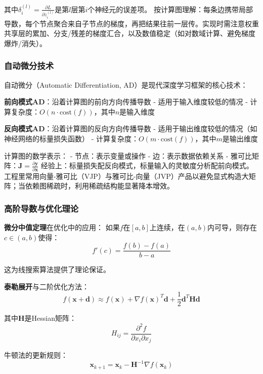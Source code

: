 其中$\delta_i^{(l)} = \frac{\partial L}{\partial z_i^{(l)}}$是第$l$层第$i$个神经元的误差项。
按计算图理解：每条边携带局部导数，每个节点聚合来自子节点的梯度，再把结果往前一层传。实现时需注意权重共享层的累加、分支/残差的梯度汇合，以及数值稳定（如对数域计算、避免梯度爆炸/消失）。

\subsubsection{自动微分技术}

自动微分（Automatic Differentiation, AD）是现代深度学习框架的核心技术：

\textbf{前向模式AD}：沿着计算图的前向方向传播导数
- 适用于输入维度较低的情况
- 计算复杂度：$O(n \cdot \text{cost}(f))$，其中$n$是输入维度

\textbf{反向模式AD}：沿着计算图的反向方向传播导数
- 适用于输出维度较低的情况（如神经网络的标量损失函数）
- 计算复杂度：$O(m \cdot \text{cost}(f))$，其中$m$是输出维度

计算图的数学表示：
- 节点：表示变量或操作
- 边：表示数据依赖关系
- 雅可比矩阵：$\mathbf{J} = \frac{\partial \mathbf{y}}{\partial \mathbf{x}}$
经验上：标量损失配反向模式，标量输入的灵敏度分析配前向模式。工程里常用向量-雅可比（VJP）与雅可比-向量（JVP）产品以避免显式构造大矩阵；当依赖图稀疏时，利用稀疏结构能显著降本增效。

\subsubsection{高阶导数与优化理论}

\textbf{微分中值定理}在优化中的应用：
如果$f$在$[a,b]$上连续，在$(a,b)$内可导，则存在$c \in (a,b)$使得：
$$f'(c) = \frac{f(b) - f(a)}{b - a}$$

这为线搜索算法提供了理论保证。

\textbf{泰勒展开}与二阶优化方法：
$$f(\mathbf{x} + \mathbf{d}) \approx f(\mathbf{x}) + \nabla f(\mathbf{x})^T \mathbf{d} + \frac{1}{2}\mathbf{d}^T \mathbf{H} \mathbf{d}$$

其中$\mathbf{H}$是Hessian矩阵：
$$H_{ij} = \frac{\partial^2 f}{\partial x_i \partial x_j}$$

牛顿法的更新规则：
$$\mathbf{x}_{k+1} = \mathbf{x}_k - \mathbf{H}^{-1} \nabla f(\mathbf{x}_k)$$

